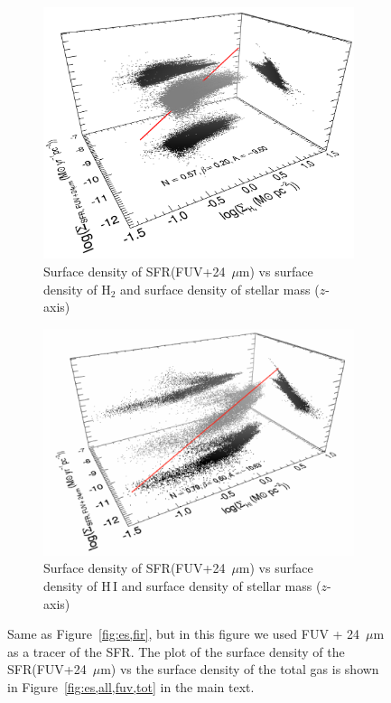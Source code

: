 {\begin{figure}
    \centering
     \begin{subfigure}[b]{0.5\textwidth}
        \centering
        \includegraphics[width=\textwidth]{../image_paper1/es_tot_fuv_vs_h22_f.png}
        \caption{Surface density of SFR(FUV+24~$\mu$m) vs surface density of H$_2$ and surface density of stellar mass ($z$-axis)}
        \label{fig:es,all,fuv,h2}
    \end{subfigure}
     \hfill
   \begin{subfigure}[b]{0.5\textwidth}
        \centering
        \includegraphics[width=\textwidth]{../image_paper1/es_tot_fuv_vs_hi2.png}
        \caption{Surface density of SFR(FUV+24~$\mu$m) vs surface density of H\,{\sc I} and surface density of stellar mass ($z$-axis)}
        \label{fig:es,all,fuv,hi}
    \end{subfigure}
   \caption{Same as Figure~\ref{fig:es,fir}, but in this figure we used FUV + 24~$\mu$m as a tracer of the SFR. The plot of the surface density of the SFR(FUV+24~$\mu$m) vs the surface density of the total gas is shown in Figure~\ref{fig:es,all,fuv,tot} in the main text.}
\end{figure}

}
